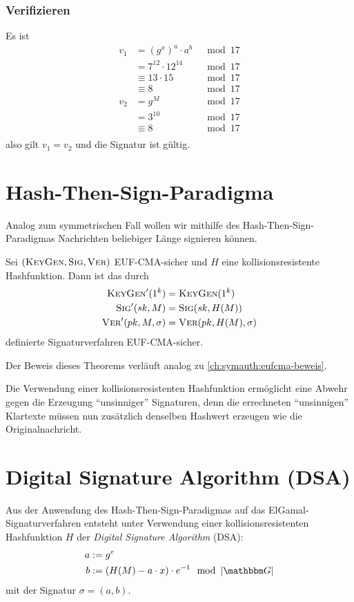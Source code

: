 \subsubsection*{Verifizieren} Es ist
\begin{align*} 
  v_1 & = (g^x)^a \cdot a^b & \mod 17 \\
      & = 7^{12} \cdot 12^{14} & \mod 17 \\ 
      & \equiv 13 \cdot 15 & \mod 17 \\
      & \equiv 8 & \mod 17 \\
  v_2 & = g^M & \mod 17 \\ 
      &= 3^{10} & \mod 17\\ 
      &\equiv 8 & \mod 17\\
\end{align*} 
also gilt $v_1=v_2$ und die Signatur ist gültig.
\section{Hash-Then-Sign-Paradigma}\indexHashSign 
Analog zum symmetrischen Fall wollen wir mithilfe des
Hash-Then-Sign-Paradigmas Nachrichten beliebiger Länge signieren können.
\begin{theorem} Sei $(\textsc{KeyGen}, \textsc{Sig},
  \textsc{Ver})$ EUF-CMA-sicher und $H$ eine kollisionsresistente
  Hashfunktion. Dann ist das durch
  \begin{align*} 
    \textsc{KeyGen}'(1^k) &= \textsc{KeyGen}(1^k)\\
    \textsc{Sig}'(sk,M) &= \textsc{Sig}(sk,H(M))\\
    \textsc{Ver}'(pk,M,\sigma) &= \textsc{Ver}(pk,H(M),\sigma)
  \end{align*} definierte Signaturverfahren EUF-CMA-sicher.
\end{theorem}

Der Beweis dieses Theorems verläuft analog zu
\ref{ch:symauth:eufcma-beweis}.

Die Verwendung einer kollisionsresistenten Hashfunktion ermöglicht
eine Abwehr gegen die Erzeugung "`unsinniger"' Signaturen, denn die
errechneten "`unsinnigen"' Klartexte müssen nun zusätzlich denselben
Hashwert erzeugen wie die Originalnachricht.


\section{Digital Signature Algorithm (DSA)} 
\indexDSA Aus der Anwendung des Hash-Then-Sign-Paradigmas auf das
ElGamal-Signaturverfahren entsteht unter Verwendung einer
kollisionsresistenten Hashfunktion $H$ der
\emph{Digital Signature Algorithm} (DSA):
\begin{align*} 
  a &:= g^e\\ 
  b &:= (H(M) - a \cdot x) \cdot e^{-1} \mod \left|\G\right|
\end{align*} 
mit der Signatur $\sigma = (a,b)$.

